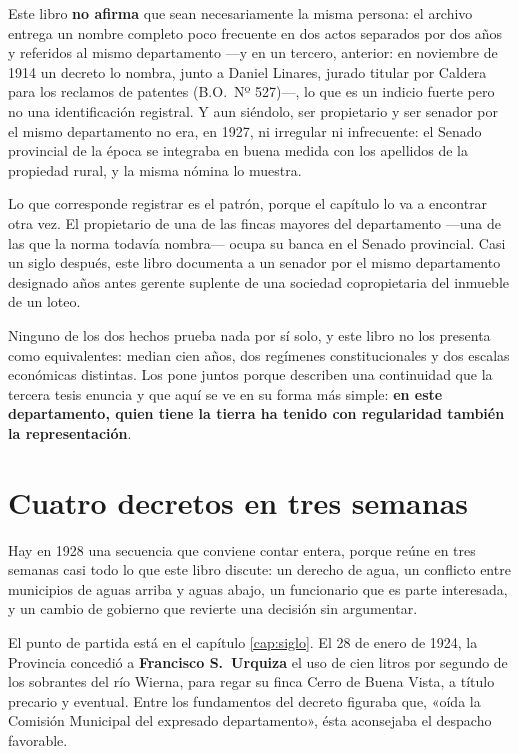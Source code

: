 \begin{cautela}
Este libro \textbf{no afirma} que sean necesariamente la misma persona: el archivo entrega
un nombre completo poco frecuente en dos actos separados por dos años y referidos al mismo
departamento ---y en un tercero, anterior: en noviembre de 1914 un decreto lo nombra, junto a
Daniel Linares, jurado titular por Caldera para los reclamos de patentes (B.O.\ Nº 527)---, lo que es un indicio fuerte pero no una identificación registral. Y aun
siéndolo, ser propietario y ser senador por el mismo departamento no era, en 1927, ni
irregular ni infrecuente: el Senado provincial de la época se integraba en buena medida con
los apellidos de la propiedad rural, y la misma nómina lo muestra.

Lo que corresponde registrar es el patrón, porque el capítulo lo va a encontrar otra vez.
El propietario de una de las fincas mayores del departamento —una de las que la norma
todavía nombra— ocupa su banca en el Senado provincial. Casi un siglo después, este
libro documenta a un senador por el mismo departamento designado años antes gerente suplente
de una sociedad copropietaria del inmueble de un loteo.

Ninguno de los dos hechos prueba nada por sí solo, y este libro no los presenta como
equivalentes: median cien años, dos regímenes constitucionales y dos escalas económicas
distintas. Los pone juntos porque describen una continuidad que la tercera tesis enuncia
y que aquí se ve en su forma más simple: \textbf{en este departamento, quien tiene la
tierra ha tenido con regularidad también la representación}.
\end{cautela}

\section{Cuatro decretos en tres semanas}

Hay en 1928 una secuencia que conviene contar entera, porque reúne en tres semanas casi
todo lo que este libro discute: un derecho de agua, un conflicto entre municipios de aguas
arriba y aguas abajo, un funcionario que es parte interesada, y un cambio de gobierno que
revierte una decisión sin argumentar.

El punto de partida está en el capítulo \ref{cap:siglo}. El 28 de enero de 1924, la Provincia concedió a
\textbf{Francisco S.\ Urquiza} el uso de cien litros por segundo de los sobrantes del río
Wierna, para regar su finca Cerro de Buena Vista, a título precario y eventual. Entre los
fundamentos del decreto figuraba que, «oída la Comisión Municipal del expresado
departamento», ésta aconsejaba el despacho favorable.

